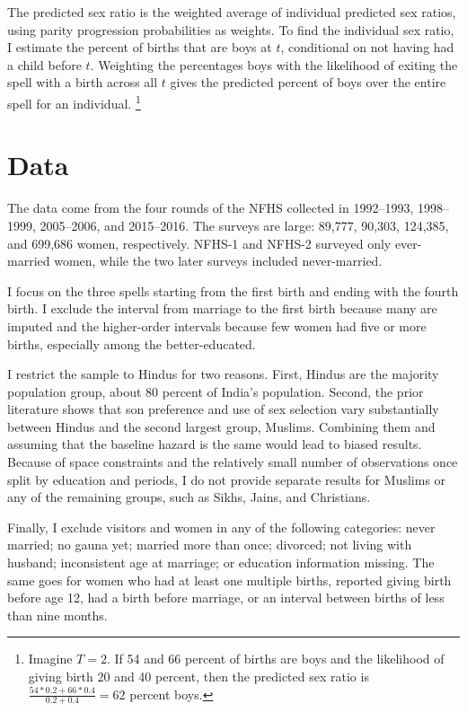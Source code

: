 \documentclass[12pt,letterpaper]{article}
\begin{document}
The predicted sex ratio is the weighted average of individual predicted sex ratios, using 
parity progression probabilities as weights.
To find the individual sex ratio, I estimate the percent of births that are boys at $t$, 
conditional on not having had a child before $t$.
Weighting the percentages boys with the likelihood of exiting the spell with a birth across all 
$t$ gives the predicted percent of boys over the entire spell for an individual.%
\footnote{
Imagine $T=2$. 
If 54 and 66 percent of births are boys and the likelihood of giving birth 20 and 40 percent, 
then the predicted sex ratio is $\frac{54*0.2+66*0.4}{0.2+0.4} = 62$ percent boys. 
}



\section{Data\label{sec:data}}

The data come from the four rounds of the NFHS
collected in 1992--1993, 1998--1999, 2005--2006, and 2015--2016.
The surveys are large: 89,777, 90,303, 124,385, and 699,686 women, respectively. 
NFHS-1 and NFHS-2 surveyed only ever-married women, while the two later surveys included 
never-married.

I focus on the three spells starting from the first birth and ending with the 
fourth birth.
I exclude the interval from marriage to the first birth because many are imputed and the
higher-order intervals because few women had five or more births, especially among the 
better-educated.

I restrict the sample to Hindus for two reasons.
First, Hindus are the majority population group, about 80 percent of India’s population.
Second, the prior literature shows that son preference and use of sex selection vary 
substantially between Hindus and the second largest group, Muslims. 
Combining them and assuming that the baseline hazard is the same would lead to biased 
results.
Because of space constraints and the relatively small number of observations once split 
by education and periods, I do not provide separate results for Muslims or any of the 
remaining groups, such as Sikhs, Jains, and Christians.

Finally, I exclude visitors and women in any of the following categories: never married; 
no gauna yet; married more than once; divorced; not living with husband; inconsistent age 
at marriage; or education information missing.  
The same goes for women who had at least one multiple births, reported giving birth 
before age 12, had a birth before marriage, or an interval between births of less than 
nine months. 
\end{document}
